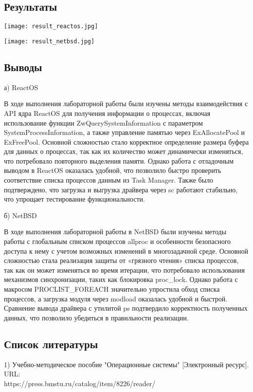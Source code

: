 \documentclass[a4paper, 14pt]{extarticle}
\begin{document}
\newpage
\vspace{1em}
\begin{center}
\section{Результаты}

\begin{minipage}{\linewidth}
\vspace{50pt}
\centering
\texttt{[image: result\_reactos.jpg]}
\label{fig:result_reactos.jpg}
\end{minipage}

\begin{minipage}{\linewidth}
\vspace{50pt}
\centering
\texttt{[image: result\_netbsd.jpg]}
\label{fig:result_netbsd.jpg}
\end{minipage}

\end{center}

\newpage

\begin{center}
\section{Выводы}
а) ReactOS
\end{center}
В ходе выполнения лабораторной работы были изучены методы взаимодействия с API ядра ReactOS для получения информации о процессах, включая использование функции ZwQuerySystemInformation с параметром SystemProcessInformation, а также управление памятью через ExAllocatePool и ExFreePool. Основной сложностью стало корректное определение размера буфера для данных о процессах, так как их количество может динамически изменяться, что потребовало повторного выделения памяти. Однако работа с отладочным выводом в ReactOS оказалась удобной, что позволило быстро проверить соответствие списка процессов данным из Task Manager. Также было подтверждено, что загрузка и выгрузка драйвера через sc работают стабильно, что упрощает тестирование функциональности.

\begin{center}
б) NetBSD
\end{center}
В ходе выполнения лабораторной работы в NetBSD были изучены методы работы с глобальным списком процессов allproc и особенности безопасного доступа к нему с учетом возможных изменений в многозадачной среде. Основной сложностью стала реализация защиты от «грязного чтения» списка процессов, так как он может изменяться во время итерации, что потребовало использования механизмов синхронизации, таких как блокировка proc\_lock. Однако работа с макросом PROCLIST\_FOREACH значительно упростила обход списка процессов, а загрузка модуля через modload оказалась удобной и быстрой. Сравнение вывода драйвера с утилитой ps подтвердило корректность полученных данных, что позволило убедиться в правильности реализации.

\begin{center}
\section{Список литературы}
\end{center}
1) Учебно-методическое пособие "Операционные системы" [Электронный ресурс]. URL:\\
https://press.bmstu.ru/catalog/item/8226/reader/\\
\end{document}
